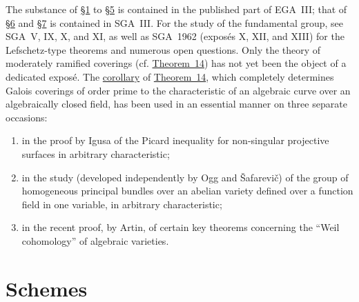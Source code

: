 \documentclass{article}
\newcommand{\oldpage}[1]{\marginpar{\footnotesize$\Big\vert$ \textit{p.~#1}}}
\begin{document}
\oldpage{C-03}
The substance of \hyperref[section1]{\S1} to \hyperref[section5]{\S5} is contained in the published part of EGA~III; that of \hyperref[section6]{\S6} and \hyperref[section7]{\S7} is contained in SGA~III.
For the study of the fundamental group, see SGA~V, IX, X, and XI, as well as SGA~1962 (expos\'{e}s X, XII, and XIII) for the Lefschetz-type theorems and numerous open questions.
Only the theory of moderately ramified coverings (cf. \hyperref[theorem14]{Theorem~14}) has not yet been the object of a dedicated expos\'{e}.
The \hyperref[theorem14corollary1]{corollary} of \hyperref[theorem14]{Theorem~14}, which completely determines Galois coverings of order prime to the characteristic of an algebraic curve over an algebraically closed field, has been used in an essential manner on three separate occasions:
\begin{enumerate}[1.]
  \item in the proof by Igusa of the Picard inequality for non-singular projective surfaces in arbitrary characteristic;
  \item in the study (developed independently by Ogg and \v{S}afarevi\v{c}) of the group of homogeneous principal bundles over an abelian variety defined over a function field in one variable, in arbitrary characteristic;
  \item in the recent proof, by Artin, of certain key theorems concerning the ``Weil cohomology'' of algebraic varieties.
\end{enumerate}


\section{Schemes}
\label{section1}
\end{document}
